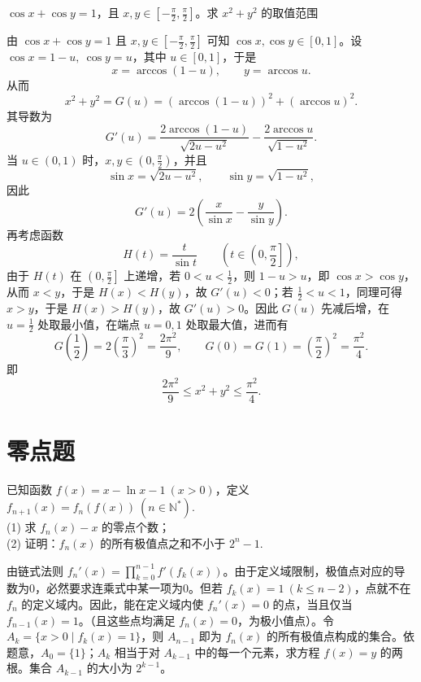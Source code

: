 \begin{example}
 $\cos x+\cos y=1$，且 $x,y\in[-\frac{\pi}{2},\frac{\pi}{2}]$。求 $x^2+y^2$ 的取值范围
\end{example}
\begin{solution}
由 $\cos x+\cos y=1$ 且 $x,y\in[-\frac{\pi}{2},\frac{\pi}{2}]$ 可知 $\cos x,\cos y\in[0,1]$。设 $\cos x=1-u,\ \cos y=u$，其中 $u\in[0,1]$，于是
\[
x=\arccos(1-u),\qquad y=\arccos u.
\]
从而
\[
x^2+y^2=G(u)=(\arccos(1-u))^2+(\arccos u)^2.
\]
其导数为
\[
G'(u)=\frac{2\arccos(1-u)}{\sqrt{2u-u^2}}-\frac{2\arccos u}{\sqrt{1-u^2}}.
\]
当 $u\in(0,1)$ 时，$x,y\in(0,\frac{\pi}{2})$，并且
\[
\sin x=\sqrt{2u-u^2},\qquad \sin y=\sqrt{1-u^2},
\]
因此
\[
G'(u)=2\left(\frac{x}{\sin x}-\frac{y}{\sin y}\right).
\]
再考虑函数
\[
H(t)=\frac{t}{\sin t}\qquad \left(t\in\left(0,\frac{\pi}{2}\right]\right),
\]
由于 $H(t)$ 在 $\left(0,\frac{\pi}{2}\right]$ 上递增，若 $0<u<\frac12$，则 $1-u>u$，即 $\cos x>\cos y$，从而 $x<y$，于是 $H(x)<H(y)$，故 $G'(u)<0$；若 $\frac12<u<1$，同理可得 $x>y$，于是 $H(x)>H(y)$，故 $G'(u)>0$。因此 $G(u)$ 先减后增，在 $u=\frac12$ 处取最小值，在端点 $u=0,1$ 处取最大值，进而有
\[
G\!\left(\frac12\right)=2\left(\frac{\pi}{3}\right)^2=\frac{2\pi^2}{9},\qquad
G(0)=G(1)=\left(\frac{\pi}{2}\right)^2=\frac{\pi^2}{4}.
\]
即
\[
\frac{2\pi^2}{9}\le x^2+y^2\le \frac{\pi^2}{4}.
\]
\end{solution}

\newpage
\section{零点题}
\begin{example}[迭代零点题]
已知函数 $f(x)=x-\ln x-1\ (x>0)$，定义 $f_{n+1}(x)=f_n(f(x))\ (n\in \mathbb{N}^*)$.\\
(1) 求 $f_n(x)-x$ 的零点个数；\\
(2) 证明：$f_n(x)$ 的所有极值点之和不小于 $2^n-1$.
\end{example}
\begin{solution}
由链式法则 $f_n'(x) = \prod_{k=0}^{n-1} f'(f_k(x))$。由于定义域限制，极值点对应的导数为0，必然要求连乘式中某一项为0。但若 $f_k(x)=1\ (k \le n-2)$，点就不在 $f_n$ 的定义域内。因此，能在定义域内使 $f_n'(x)=0$ 的点，当且仅当 $f_{n-1}(x)=1$。（且这些点均满足 $f_n(x)=0$，为极小值点）。令 $A_k = \{x > 0 \mid f_k(x) = 1\}$，则 $A_{n-1}$ 即为 $f_n(x)$ 的所有极值点构成的集合。依题意，$A_0=\{1\}$；$A_k$ 相当于对 $A_{k-1}$ 中的每一个元素，求方程 $f(x)=y$ 的两根。集合 $A_{k-1}$ 的大小为 $2^{k-1}$。
\end{solution}


